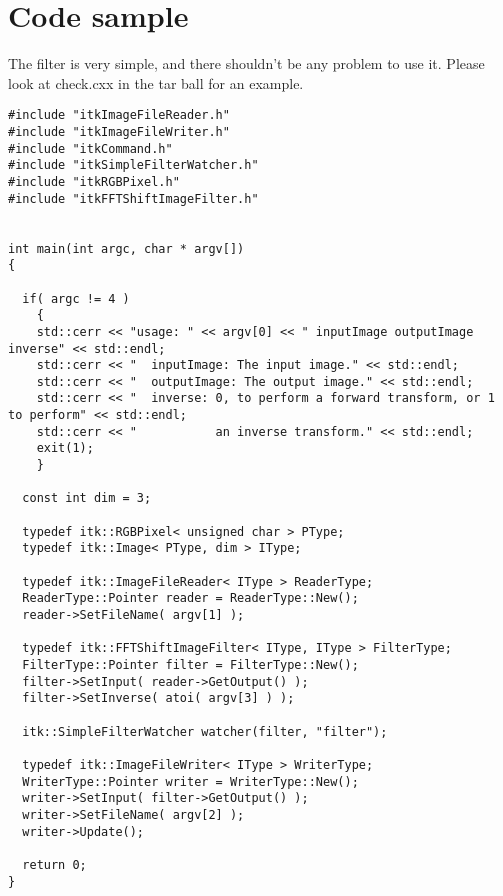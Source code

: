 \documentclass{InsightArticle}
\begin{document}
\section{Code sample}

The filter is very simple, and there shouldn't be any problem to use it. Please
look at check.cxx in the tar ball for an example.

\small \begin{verbatim}
#include "itkImageFileReader.h"
#include "itkImageFileWriter.h"
#include "itkCommand.h"
#include "itkSimpleFilterWatcher.h"
#include "itkRGBPixel.h"
#include "itkFFTShiftImageFilter.h"


int main(int argc, char * argv[])
{

  if( argc != 4 )
    {
    std::cerr << "usage: " << argv[0] << " inputImage outputImage inverse" << std::endl;
    std::cerr << "  inputImage: The input image." << std::endl;
    std::cerr << "  outputImage: The output image." << std::endl;
    std::cerr << "  inverse: 0, to perform a forward transform, or 1 to perform" << std::endl;
    std::cerr << "           an inverse transform." << std::endl;
    exit(1);
    }

  const int dim = 3;
  
  typedef itk::RGBPixel< unsigned char > PType;
  typedef itk::Image< PType, dim > IType;

  typedef itk::ImageFileReader< IType > ReaderType;
  ReaderType::Pointer reader = ReaderType::New();
  reader->SetFileName( argv[1] );

  typedef itk::FFTShiftImageFilter< IType, IType > FilterType;
  FilterType::Pointer filter = FilterType::New();
  filter->SetInput( reader->GetOutput() );
  filter->SetInverse( atoi( argv[3] ) );

  itk::SimpleFilterWatcher watcher(filter, "filter");

  typedef itk::ImageFileWriter< IType > WriterType;
  WriterType::Pointer writer = WriterType::New();
  writer->SetInput( filter->GetOutput() );
  writer->SetFileName( argv[2] );
  writer->Update();

  return 0;
}
\end{verbatim} \normalsize

\appendix





\nocite{ITKSoftwareGuide}
\end{document}
